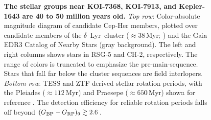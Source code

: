 \documentclass[12pt,twocolumn,linenumbers]{aastex63}
\newcommand{\bpmrpo}{(G_{\rm BP}-G_{\rm RP})_0}
\begin{document}
\begin{figure}[tp]
\begin{center}
		\vspace{-0.6cm}
	\end{center}
	\vspace{-0.7cm}
	\caption{
		{\bf The stellar groups near KOI-7368, KOI-7913, and Kepler-1643
    are 40 to 50 million years old.} 
    {\it Top row}: 
    Color-absolute magnitude diagram of candidate Cep-Her members, plotted
    over candidate members of the $\delta$~Lyr~cluster
    ($\approx38$\,Myr; \citealt{bouma_kep1627_2022}) and the Gaia
    EDR3 Catalog of Nearby Stars (gray background).  The left and
    right columns shows stars in RSG-5 and CH-2, respectively.  The
    range of colors is truncated to emphasize the pre-main-sequence.
    Stars that fall far below the cluster sequences are field
    interlopers.
    {\it Bottom row}:
    TESS and ZTF-derived stellar rotation periods, with the Pleiades
    ($\approx 112$\,Myr) and Praesepe ($\approx 650$\,Myr) shown for reference
    \citep{rebull_rotation_2016a,douglas_poking_2017}.
    The detection efficiency for reliable rotation periods falls off
    beyond $\bpmrpo \gtrsim 2.6$.
	\label{fig:age}
	}
\end{figure}
\end{document}
